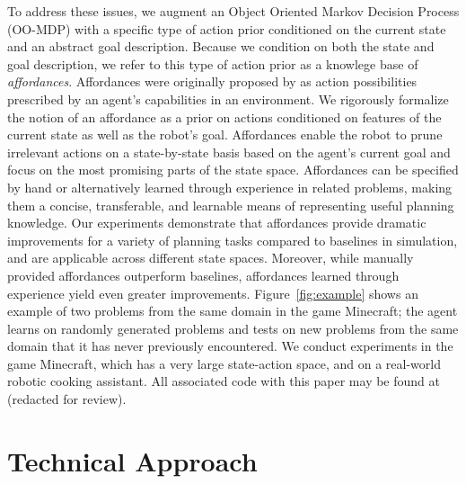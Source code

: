 \documentclass[letterpaper]{article}
\begin{document}
To address these issues, we augment an Object Oriented Markov Decision
Process (OO-MDP) with a specific type of action prior conditioned on
the current state and an abstract goal description.  Because we
condition on both the state and goal description, we refer to this
type of action prior as a knowlege base of {\em affordances}.
Affordances were originally proposed by \citet{gibson77} as action
possibilities prescribed by an agent's capabilities in an environment.
We rigorously formalize the notion of an affordance as a prior on
actions conditioned on features of the current state as well as the
robot's goal.  Affordances enable the robot to prune irrelevant
actions on a state-by-state basis based on the agent's current goal
and focus on the most promising parts of the state space.  Affordances
can be specified by hand or alternatively learned through experience
in related problems, making them a concise, transferable, and
learnable means of representing useful planning knowledge. Our
experiments demonstrate that affordances provide dramatic improvements
for a variety of planning tasks compared to baselines in simulation,
and are applicable across different state spaces.  Moreover, while
manually provided affordances outperform baselines, affordances
learned through experience yield even greater improvements.
Figure~\ref{fig:example} shows an example of two problems from the
same domain in the game Minecraft; the agent learns on randomly
generated problems and tests on new problems from the same domain that
it has never previously encountered.  We conduct experiments in the
game Minecraft, which has a very large state-action space, and on a
real-world robotic cooking assistant.  All associated code with this
paper may be found at (redacted for review).


\section{Technical Approach}
\label{sec:affordances}
\end{document}
